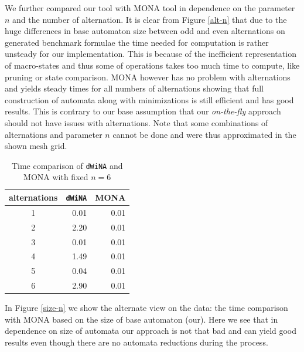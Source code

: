 We further compared our tool with \textsc{MONA} tool in dependence on the
parameter $n$ and the number of alternation. It is clear from Figure \ref{alt-n}
that due to the huge differences in base automaton size between odd and even
alternations on generated benchmark formulae the time needed for computation is
rather unsteady for our implementation. This is because of the
inefficient representation of macro-states and thus some of operations takes too
much time to compute, like pruning or state comparison. \textsc{MONA} however
has no problem with alternations and yields steady times for all numbers of
alternations showing that full construction of automata along with minimizations
is still efficient and has good results. This is contrary to our base
assumption that our \emph{on-the-fly} approach should not have issues with
alternations. Note that some combinations of alternations and parameter $n$
cannot be done and were thus approximated in the shown mesh grid.

\begin{table}
\begin{center}
 \begin{tabular}{|c|r|r|}
  \hline
  \textbf{alternations} & \texttt{dWiNA} & \textsc{MONA}\\
  \hline
  \hline
  1 & 0.01 & 0.01\\
  \hline
  2 & 2.20 & 0.01\\
  \hline
  3 & 0.01 & 0.01\\
  \hline
  4 & 1.49 & 0.01\\
  \hline
  5 & 0.04 & 0.01\\
  \hline
  6 & 2.90 & 0.01\\
  \hline
 \end{tabular}
 \end{center}
 \caption{Time comparison of \texttt{dWiNA} and \textsc{MONA} with fixed $n =
 6$}
\end{table}
\newpage
In Figure \ref{size-n} we show the alternate view on the data: the time
comparison with \textsc{MONA} based on the size of base automaton (our). Here we
see that in dependence on size of automata our approach is not that bad and can
yield good results even though there are no automata reductions during the
process.


